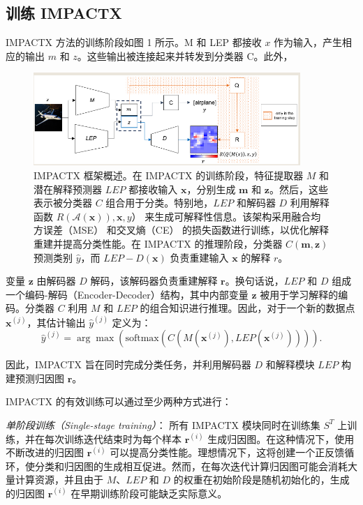 \documentclass[12pt, a4paper]{ctexart} %
\begin{document}
\subsection{训练 IMPACTX}
IMPACTX 方法的训练阶段如图 1 所示。M 和 LEP 都接收 $x$ 作为输入，产生相应的输出 $m$ 和 $z$。这些输出被连接起来并转发到分类器 C。此外，

\begin{figure}[H]
    \centering
    \includegraphics[width=0.9\textwidth]{img/IMPACTX_1.png}
    \caption{ IMPACTX 框架概述。在 IMPACTX 的训练阶段，特征提取器 \( M \) 和潜在解释预测器 \( LEP \) 都接收输入 \( \mathbf{x} \)，分别生成 \( \mathbf{m} \) 和 \( \mathbf{z} \)。然后，这些表示被分类器 \( C \) 组合用于分类。特别地，\( LEP \) 和解码器 \( D \) 利用解释函数 \( R(\mathcal{A}(\mathbf{x})), \mathbf{x}, y） \) 来生成可解释性信息。该架构采用融合均方误差（MSE） 和交叉熵（CE） 的损失函数进行训练，以优化解释重建并提高分类性能。在 IMPACTX 的推理阶段，分类器 \( C(\mathbf{m}, \mathbf{z}) \) 预测类别 \( \hat{y} \)，而 \( LEP - D(\mathbf{x}) \) 负责重建输入 \( \mathbf{x} \) 的解释 \( r \)。}
\end{figure}


变量 \( \mathbf{z} \) 由解码器 \( D \) 解码，该解码器负责重建解释 \( \mathbf{r} \)。换句话说，\( LEP \) 和 \( D \) 组成一个编码-解码（Encoder-Decoder）结构，其中内部变量 \( \mathbf{z} \) 被用于学习解释的编码。分类器 \( C \) 利用 \( M \) 和 \( LEP \) 的组合知识进行推理。因此，对于一个新的数据点 \( \mathbf{x}^{(j)} \)，其估计输出 \( \hat{y}^{(j)} \) 定义为：
\[
\hat{y}^{(j)} = \arg\max \left( \text{softmax} \left( C\left(M(\mathbf{x}^{(j)}), LEP(\mathbf{x}^{(j)})\right) \right) \right).
\]

因此，IMPACTX 旨在同时完成分类任务，并利用解码器 \( D \) 和解释模块 \( LEP \) 构建预测归因图 \( \mathbf{r} \)。

IMPACTX 的有效训练可以通过至少两种方式进行：

\textit{单阶段训练（Single-stage training）}：
所有 IMPACTX 模块同时在训练集 \( S^T \) 上训练，并在每次训练迭代结束时为每个样本 \( \mathbf{r}^{(i)} \) 生成归因图。在这种情况下，使用不断改进的归因图 \( \mathbf{r}^{(i)} \) 可以提高分类性能。理想情况下，这将创建一个正反馈循环，使分类和归因图的生成相互促进。然而，在每次迭代计算归因图可能会消耗大量计算资源，并且由于 \( M \)、\( LEP \) 和 \( D \) 的权重在初始阶段是随机初始化的，生成的归因图 \( \mathbf{r}^{(i)} \) 在早期训练阶段可能缺乏实际意义。
\end{document}
